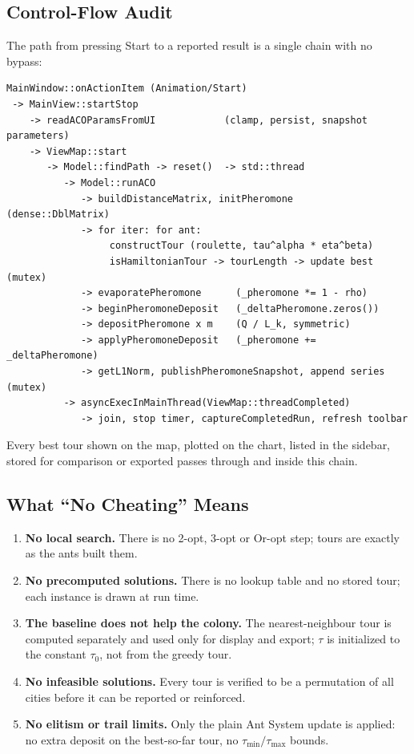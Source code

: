 \documentclass[11pt,a4paper]{article}
\begin{document}
\subsection{Control-Flow Audit}
The path from pressing Start to a reported result is a single chain with no bypass:
\begin{verbatim}
MainWindow::onActionItem (Animation/Start)
 -> MainView::startStop
    -> readACOParamsFromUI            (clamp, persist, snapshot parameters)
    -> ViewMap::start
       -> Model::findPath -> reset()  -> std::thread
          -> Model::runACO
             -> buildDistanceMatrix, initPheromone        (dense::DblMatrix)
             -> for iter: for ant:
                  constructTour (roulette, tau^alpha * eta^beta)
                  isHamiltonianTour -> tourLength -> update best (mutex)
             -> evaporatePheromone      (_pheromone *= 1 - rho)
             -> beginPheromoneDeposit   (_deltaPheromone.zeros())
             -> depositPheromone x m    (Q / L_k, symmetric)
             -> applyPheromoneDeposit   (_pheromone += _deltaPheromone)
             -> getL1Norm, publishPheromoneSnapshot, append series (mutex)
          -> asyncExecInMainThread(ViewMap::threadCompleted)
             -> join, stop timer, captureCompletedRun, refresh toolbar
\end{verbatim}
Every best tour shown on the map, plotted on the chart, listed in the sidebar, stored for comparison or
exported passes through  and  inside this chain.

\subsection{What ``No Cheating'' Means}
\begin{enumerate}
  \item \textbf{No local search.} There is no 2-opt, 3-opt or Or-opt step; tours are exactly as the ants
        built them.
  \item \textbf{No precomputed solutions.} There is no lookup table and no stored tour; each instance is
        drawn at run time.
  \item \textbf{The baseline does not help the colony.} The nearest-neighbour tour is computed separately and
        used only for display and export; $\tau$ is initialized to the constant $\tau_0$, not from the greedy
        tour.
  \item \textbf{No infeasible solutions.} Every tour is verified to be a permutation of all cities before it
        can be reported or reinforced.
  \item \textbf{No elitism or trail limits.} Only the plain Ant System update is applied: no extra deposit
        on the best-so-far tour, no $\tau_{\min}/\tau_{\max}$ bounds.
\end{enumerate}
\end{document}
